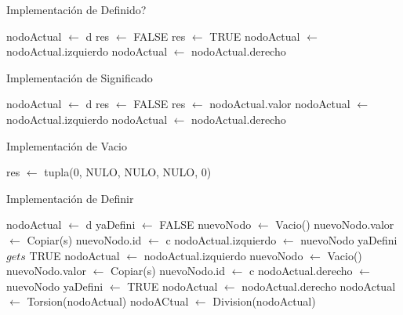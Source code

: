 \newpage

\begin{Algoritmos}

\begin{algorithm}
\caption{Implementaci\'on de Definido?}
\begin{algorithmic}[0]
	\State nodoActual $\gets$ d
	\State res $\gets$ FALSE
			res $\gets$ TRUE
		\Else
				nodoActual $\gets$ nodoActual.izquierdo
			\Else
				nodoActual $\gets$ nodoActual.derecho
			\EndIf
		\EndIf
	\EndWhile
\EndFunction
\end{algorithmic}
\end{algorithm}

\begin{algorithm}
\caption{Implementaci\'on de Significado}
\begin{algorithmic}[0]
	\State nodoActual $\gets$ d
	\State res $\gets$ FALSE
			res $\gets$ nodoActual.valor
		\Else
				nodoActual $\gets$ nodoActual.izquierdo
			\Else
				nodoActual $\gets$ nodoActual.derecho
			\EndIf
		\EndIf
	\EndWhile
\EndFunction
\end{algorithmic}
\end{algorithm}

\begin{algorithm}
\caption{Implementaci\'on de Vacio}
\begin{algorithmic}[0]
	\State res $\gets$ tupla(0, NULO, NULO, NULO, 0)
\EndFunction
\end{algorithmic}
\end{algorithm}

\begin{algorithm}
\caption{Implementaci\'on de Definir}
\begin{algorithmic}[0]
	\State nodoActual $\gets$ d
	\State yaDefini $\gets$ FALSE
				\State nuevoNodo $\gets$ Vacio() 
				\State nuevoNodo.valor $\gets$ Copiar(s)
				\State nuevoNodo.id $\gets$ c
				\State nodoActual.izquierdo $\gets$ nuevoNodo
				\State yaDefini $gets$ TRUE
			\Else
				\State nodoActual $\gets$ nodoActual.izquierdo
			\EndIf
		\Else
				\State nuevoNodo $\gets$ Vacio() 
				\State nuevoNodo.valor $\gets$ Copiar(s)
				\State nuevoNodo.id $\gets$ c
				\State nodoActual.derecho $\gets$ nuevoNodo
				\State yaDefini $\gets$ TRUE
			\Else
				\State nodoActual $\gets$ nodoActual.derecho
			\EndIf
		\EndIf
	\EndWhile
	\State nodoActual $\gets$ Torsion(nodoActual)
	\State nodoACtual $\gets$ Division(nodoActual)
\EndFunction
\end{algorithmic}
\end{algorithm}



\end{Algoritmos}
